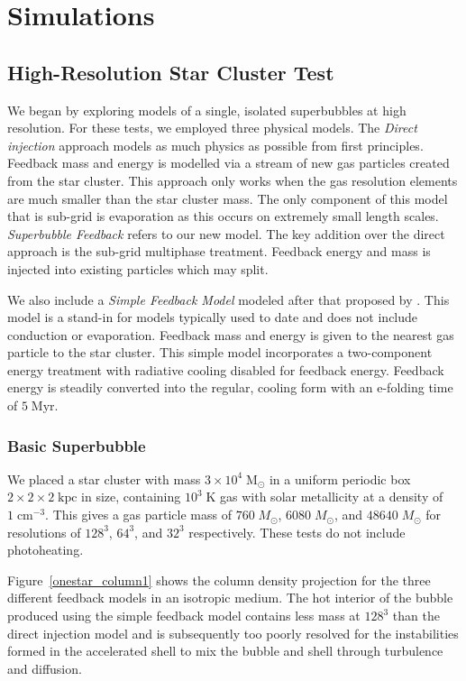 \section{Simulations}
\subsection{High-Resolution Star Cluster Test}\label{cluster1}
We began by exploring models of a single, isolated superbubbles at high
resolution.  For these tests, we employed three physical models.  The {\it
Direct injection} approach models as much physics as possible from first
principles.  Feedback mass and energy is modelled via a stream of new gas
particles created from the star cluster.  This approach only works when the gas
resolution elements are much smaller than the star cluster mass.  The only
component of this model that is sub-grid is evaporation as this occurs on
extremely small length scales.  {\it Superbubble Feedback} refers to our new
model.  The key addition over the direct approach is the sub-grid multiphase
treatment.  Feedback energy and mass is injected into existing particles which
may split.  

We also include a {\it Simple Feedback
Model} modeled after that proposed by \citet{Agertz2013}.  This model is a
stand-in for models typically used to date and does not include conduction or
evaporation.  Feedback mass and energy is given to the nearest gas particle to
the star cluster.  This simple model incorporates a two-component energy
treatment with radiative cooling disabled for feedback energy.  Feedback energy
is steadily converted into the regular, cooling form with an e-folding time of
$5\;\mathrm{Myr}$. 

\subsubsection{Basic Superbubble}

We placed a star cluster with mass $3\times10^4\;\mathrm{M_\odot}$ in a uniform
periodic box $2\times2\times2\;\mathrm{kpc}$ in size, containing
$10^3\;\mathrm{K}$ gas with solar metallicity at a density of
$1\;\mathrm{cm^{-3}}$.   This gives a gas particle mass of $760\; M_\odot$,
$6080\; M_\odot$, and $48640\; M_\odot$ for resolutions of $128^3$, $64^3$, and
$32^3$ respectively.  These tests do not include photoheating. 

Figure~\ref{onestar_column1} shows the column density projection for the three
different feedback models in an isotropic medium.  The hot interior of the
bubble produced using the simple feedback model contains less mass at $128^3$
than the direct injection model and is subsequently too poorly resolved for the
instabilities formed in the accelerated shell \citep{Vishniac1983} to mix the
bubble and shell through turbulence and diffusion.

